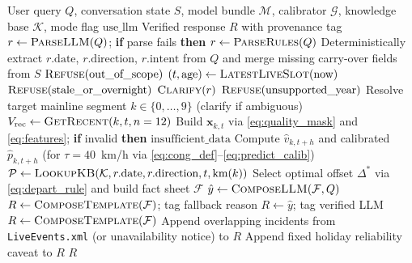 \documentclass[conference]{IEEEtran}
\begin{document}
\begin{algorithm}[!t]
\caption{Explainable Freeway Congestion Prediction Agent}
\label{alg:agent}
\begin{algorithmic}[1]
\Require User query $Q$, conversation state $S$, model bundle $\mathcal{M}$, calibrator $\mathcal{G}$, knowledge base $\mathcal{K}$, mode flag $\text{use\_llm}$
\Ensure Verified response $R$ with provenance tag
\State $r \gets \textsc{ParseLLM}(Q)$; \textbf{if} parse fails \textbf{then} $r \gets \textsc{ParseRules}(Q)$
\State Deterministically extract $r.\text{date}$, $r.\text{direction}$, $r.\text{intent}$ from $Q$ and merge missing carry-over fields from $S$
    \State \Return $\textsc{Refuse}(\text{out\_of\_scope})$
\EndIf
{}
    \State $(t, \text{age}) \gets \textsc{LatestLiveSlot}(\text{now})$
        \State \Return $\textsc{Refuse}(\text{stale\_or\_overnight})$
    \EndIf
{}
    \State \Return $\textsc{Clarify}(r)$
    \State \Return $\textsc{Refuse}(\text{unsupported\_year})$
\EndIf
\State Resolve target mainline segment $k \in \{0,\dots,9\}$ (clarify if ambiguous)
\State $V_{\text{rec}} \gets \textsc{GetRecent}(k, t, n=12)$
\State Build $\mathbf{x}_{k,t}$ via \eqref{eq:quality_mask} and \eqref{eq:features}; \textbf{if} invalid \textbf{then} \Return $\text{insufficient\_data}$
    \State Compute $\hat{v}_{k,t+h}$ and calibrated $\hat{p}_{k,t+h}$ (for $\tau=40$~km/h via \eqref{eq:cong_def}--\eqref{eq:predict_calib})
\EndFor
\State $\mathcal{P} \gets \textsc{LookupKB}(\mathcal{K}, r.\text{date}, r.\text{direction}, t, \text{km}(k))$
\State Select optimal offset $\Delta^*$ via \eqref{eq:depart_rule} and build fact sheet $\mathcal{F}$
    \State $\hat{y} \gets \textsc{ComposeLLM}(\mathcal{F}, Q)$
        \State $R \gets \textsc{ComposeTemplate}(\mathcal{F})$; tag fallback reason
    \Else
        \State $R \gets \hat{y}$; tag verified LLM
    \EndIf
\Else
    \State $R \gets \textsc{ComposeTemplate}(\mathcal{F})$
\EndIf
{}
    \State Append overlapping incidents from \texttt{LiveEvents.xml} (or unavailability notice) to $R$
\EndIf
{}
    \State Append fixed holiday reliability caveat to $R$
\EndIf
\State \Return $R$
\end{algorithmic}
\end{algorithm}
\end{document}
